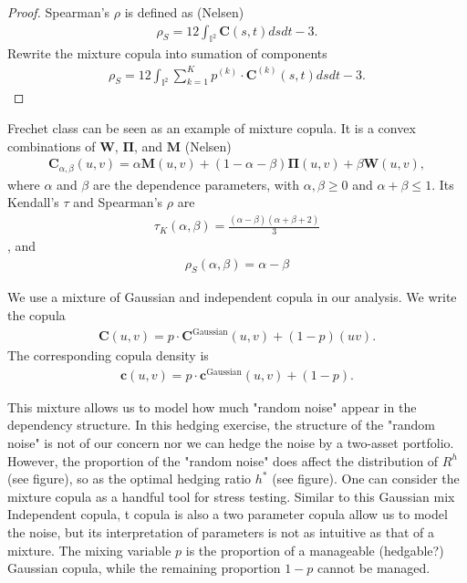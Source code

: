 \begin{proof}
    Spearman's $\rho$ is defined as (Nelsen)
    \begin{align}
        \rho_S = 12 \int_{\mathbb{I}^2} \bm{C}(s,t) ds dt - 3.
        \end{align}
    Rewrite the mixture copula into sumation of components
       \begin{align}
        \rho_S = 12 \int_{\mathbb{I}^2} \sum_{k=1}^K p^{(k)} \cdot \bm{C}^{(k)}(s,t) ds dt - 3.
        \end{align}
    \end{proof}
\begin{example}
    Frechet class can be seen as an example of mixture copula.
    It is a convex combinations of $\bm{W}$, $\bm{\Pi}$, and $\bm{M}$ (Nelsen)
    \begin{align}
        \bm{C}_{\alpha, \beta}(u,v)
        = \alpha \bm{M}(u,v) +
        (1-\alpha-\beta)\bm{\Pi}(u,v)
        +\beta \bm{W}(u,v),
        \end{align}
    where $\alpha$ and $\beta$ are the dependence parameters, with $\alpha, \beta \geq 0$ and
    $\alpha+\beta \leq 1$.
    Its Kendall's $\tau$ and Spearman's $\rho$ are
    \begin{align}
        \tau_K(\alpha, \beta) = \frac{(\alpha - \beta)(\alpha+\beta+2)}{3}
        \end{align}
    , and
    \begin{align}
        \rho_S(\alpha, \beta) = \alpha - \beta
        \end{align}
    \end{example}\medskip

We use a mixture of Gaussian and independent copula in our analysis.
We write the copula
\begin{align}
    \bm{C}(u,v) = p\cdot \bm{C}^\text{Gaussian}(u,v) + (1-p)(uv).
    \end{align}
The corresponding copula density is
\begin{align}
    \bm{c}(u,v) = p\cdot \bm{c}^\text{Gaussian}(u,v) + (1-p).
    \end{align}

This mixture allows us to model how much "random noise" appear in the dependency structure.
In this hedging exercise, the structure of the "random noise" is not of our concern nor we can
hedge the noise by a two-asset portfolio.
However, the proportion of the "random noise" does affect the distribution of $R^h$ (see figure),
so as the optimal hedging ratio $h^\ast$ (see figure).
One can consider the mixture copula as a handful tool for stress testing.
Similar to this Gaussian mix Independent copula,
t copula is also a two parameter copula allow us to model the noise,
but its interpretation of parameters is not as intuitive as that of a mixture.
The mixing variable $p$ is the proportion of a manageable (hedgable?) Gaussian copula,
while the remaining proportion $1-p$ cannot be managed.
